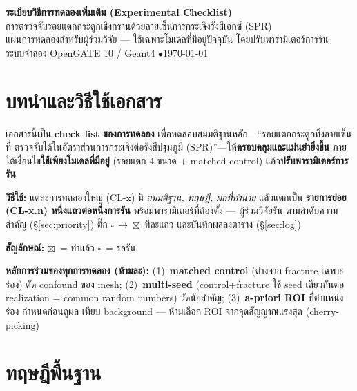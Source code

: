 \documentclass[14pt]{extarticle}
\newcommand{\todo}{\textcolor{theme}{$\square$}}
\newcommand{\done}{\textcolor{ok}{$\boxtimes$}}
\begin{document}
\begin{center}
{\LARGE\bfseries\color{theme} ระเบียบวิธีการทดลองเพิ่มเติม (Experimental Checklist)}\\[4pt]
{\Large การตรวจจับรอยแตกกระดูกเชิงกรานด้วยลายเซ็นการกระเจิงรังสีเอกซ์ (SPR)}\\[6pt]
{\small แผนการทดลองสำหรับผู้ร่วมวิจัย --- ใช้เฉพาะโมเดลที่มีอยู่ปัจจุบัน โดยปรับพารามิเตอร์การรัน}\\
{\small ระบบจำลอง OpenGATE 10 / Geant4 \quad$\bullet$\quad \today}
\end{center}
\vspace{2pt}{\color{theme!45}\hrule}\vspace{8pt}

\section{บทนำและวิธีใช้เอกสาร}
เอกสารนี้เป็น \textbf{check list ของการทดลอง} เพื่อทดสอบสมมติฐานหลัก---``รอยแตกกระดูกทิ้งลายเซ็นที่
ตรวจจับได้ในอัตราส่วนการกระเจิงต่อรังสีปฐมภูมิ (SPR)''---ให้\textbf{ครอบคลุมและแม่นยำยิ่งขึ้น}
ภายใต้เงื่อนไข\textbf{ใช้เพียงโมเดลที่มีอยู่} (รอยแตก 4 ขนาด + matched control) แล้ว\textbf{ปรับพารามิเตอร์การรัน}

\noindent\textbf{วิธีใช้:} แต่ละการทดลองใหญ่ (CL-x) มี \emph{สมมติฐาน, ทฤษฎี, ผลที่ทำนาย} แล้วแตกเป็น
\textbf{รายการย่อย (CL-x.n) หนึ่งแถวต่อหนึ่งการรัน} พร้อมพารามิเตอร์ที่ต้องตั้ง --- ผู้ร่วมวิจัยรัน
ตามลำดับความสำคัญ (\S\ref{sec:priority}) ติ๊ก \todo\,$\to$\,\done\ ทีละแถว และบันทึกผลลงตาราง (\S\ref{sec:log})

\noindent\textbf{สัญลักษณ์:} \done~= ทำแล้ว \quad \todo~= รอรัน

\begin{tcolorbox}[colback=softgray, colframe=theme!25, boxrule=0.5pt, arc=2pt]
\textbf{หลักการร่วมของทุกการทดลอง (ห้ามละ):} (1)~\textbf{matched control} (ต่างจาก fracture เฉพาะร่อง)
ตัด confound ของ mesh; (2)~\textbf{multi-seed} (control+fracture ใช้ seed เดียวกันต่อ realization =
common random numbers) วัดนัยสำคัญ; (3)~\textbf{a-priori ROI} ที่ตำแหน่งร่อง กำหนดก่อนดูผล เทียบ background ---
ห้ามเลือก ROI จากจุดสัญญาณแรงสุด (cherry-picking)
\end{tcolorbox}

\section{ทฤษฎีพื้นฐาน}
\end{document}
